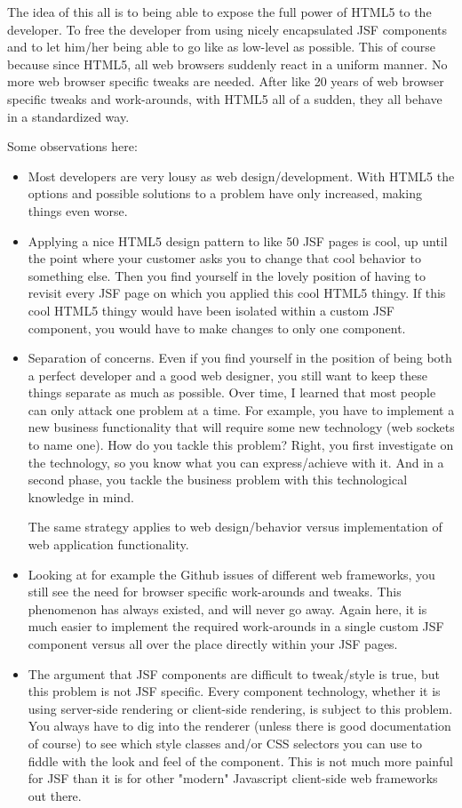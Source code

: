 The idea of this all is to being able to expose the full power of HTML5 to the developer.
To free the developer from using nicely encapsulated JSF components and to let him/her being able to go like as low-level as possible.
This of course because since HTML5, all web browsers suddenly react in a uniform manner.
No more web browser specific tweaks are needed.
After like 20 years of web browser specific tweaks and work-arounds, with HTML5 all of a sudden, they all behave in a standardized way.

Some observations here:
\begin{itemize}
	\item Most developers are very lousy as web design/development. With HTML5 the options and possible solutions to a problem have only increased, making things even worse.
	\item Applying a nice HTML5 design pattern to like 50 JSF pages is cool, up until the point where your customer asks you to change that cool behavior to something else. Then you find yourself in the lovely position of having to revisit every JSF page on which you applied this cool HTML5 thingy.
	If this cool HTML5 thingy would have been isolated within a custom JSF component, you would have to make changes to only one component.
	\item Separation of concerns. Even if you find yourself in the position of being both a perfect developer and a good web designer, you still want to keep these things separate as much as possible.
	Over time, I learned that most people can only attack one problem at a time.
	For example, you have to implement a new business functionality that will require some new technology (web sockets to name one).
	How do you tackle this problem? Right, you first investigate on the technology, so you know what you can express/achieve with it.
	And in a second phase, you tackle the business problem with this technological knowledge in mind.
	
	The same strategy applies to web design/behavior versus implementation of web application functionality.
	
	\item Looking at for example the Github issues of different web frameworks,
	you still see the need for browser specific work-arounds and tweaks.
	This phenomenon has always existed, and will never go away.
	Again here, it is much easier to implement the required work-arounds in a single custom JSF component versus all over the place directly within your JSF pages.
	
	\item The argument that JSF components are difficult to tweak/style is true, but this problem is not JSF specific.
	Every component technology, whether it is using server-side rendering or client-side rendering,
	is subject to this problem.
	You always have to dig into the renderer (unless there is good documentation of course)
	to see which style classes and/or CSS selectors you can use to fiddle with the look and feel of the component.
	This is not much more painful for JSF than it is for other "modern" Javascript client-side web frameworks out there.
\end{itemize}

